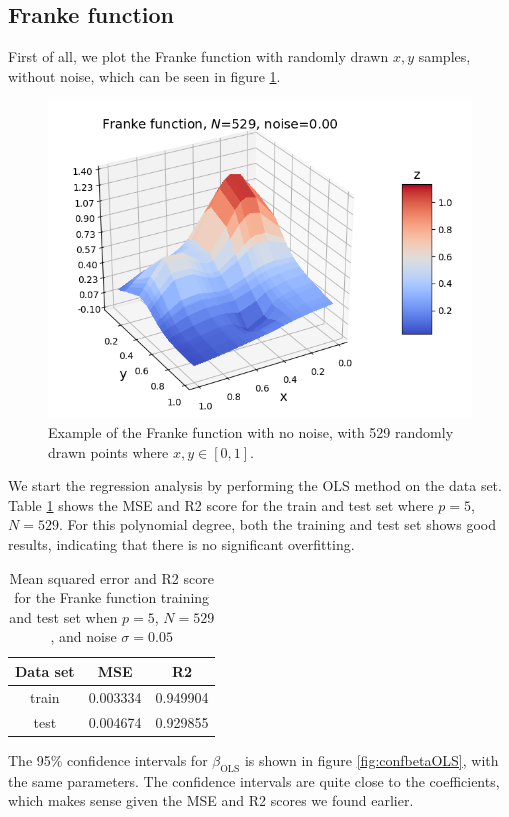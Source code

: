 \documentclass[a4paper]{article}
\begin{document}
\subsection{Franke function}
First of all, we plot the Franke function with randomly drawn $x,y$ samples, without noise, which can be seen in figure \ref{fig:franke_nonoise}.
\begin{figure}[H]
	\centering
	\includegraphics[scale=0.6]{../figures/task_a/surf_franke_N529_nf23_p5_noise0.00_seed4155.png}
	\caption{Example of the Franke function with no noise, with 529 randomly drawn points where $x,y \in [0,1]$.}
	\label{fig:franke_nonoise}
\end{figure}
%
We start the regression analysis by performing the OLS method on the data set. Table \ref{tab:franke_a} shows the MSE and R2 score for the train and test set where $p=5$, $N=529$. For this polynomial degree, both the training and test set shows good results, indicating that there is no significant overfitting.
\begin{table}[H]
  \centering
  \caption{Mean squared error and R2 score for the Franke function training and test set when $p=5$, $N=529$, and noise $\sigma = 0.05$}
  \label{tab:franke_a}
  \begin{tabular}{c|c|c}
    Data set & MSE & R2\\\hline
    train & 0.003334 & 0.949904\\
    test & 0.004674 & 0.929855
    \end{tabular}
\end{table}
The 95\% confidence intervals for $\beta_{\text{OLS}}$ is shown in figure \ref{fig:confbetaOLS}, with the same parameters. The confidence intervals are quite close to the coefficients, which makes sense given the MSE and R2 scores we found earlier.
\end{document}
